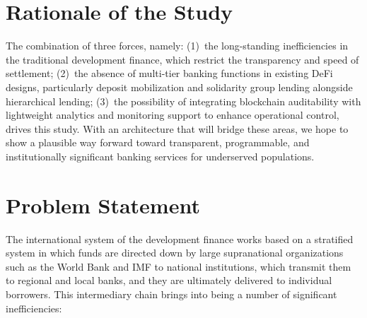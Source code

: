 \documentclass[12pt,a4paper]{report}
\begin{document}
\section{Rationale of the Study}

The combination of three forces, namely: (1)~the long-standing inefficiencies in the traditional development finance, which restrict the transparency and speed of settlement; (2)~the absence of multi-tier banking functions in existing DeFi designs, particularly deposit mobilization and solidarity group lending alongside hierarchical lending; (3)~the possibility of integrating blockchain auditability with lightweight analytics and monitoring support to enhance operational control, drives this study. With an architecture that will bridge these areas, we hope to show a plausible way forward toward transparent, programmable, and institutionally significant banking services for underserved populations.

\section{Problem Statement}

The international system of the development finance works based on a stratified system in which funds are directed down by large supranational organizations such as the World Bank and IMF to national institutions, which transmit them to regional and local banks, and they are ultimately delivered to individual borrowers. This intermediary chain brings into being a number of significant inefficiencies:
\end{document}
